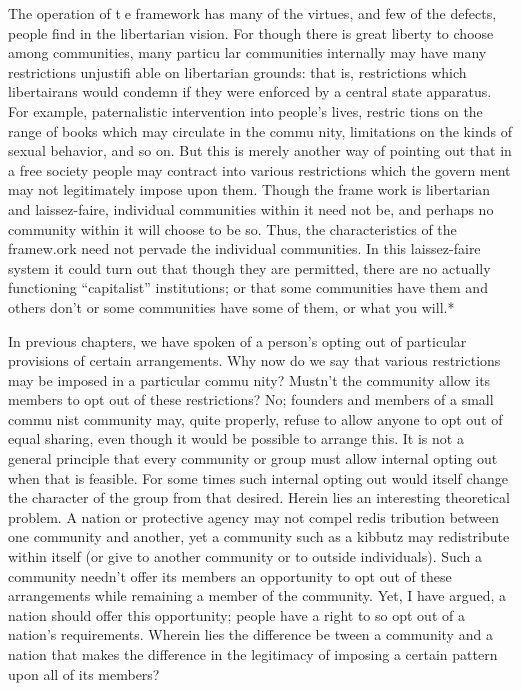 \documentclass[11pt,openany]{book}
\begin{document}
The operation of te framework has many of the virtues, and few of the defects, people find in the libertarian vision. For though there is great liberty to choose among communities, many particu lar communities internally may have many restrictions unjustifi able on libertarian grounds: that is, restrictions which libertairans would condemn if they were enforced by a central state apparatus. For example, paternalistic intervention into people's lives, restric tions on the range of books which may circulate in the commu nity, limitations on the kinds of sexual behavior, and so on. But this is merely another way of pointing out that in a free society people may contract into various restrictions which the govern ment may not legitimately impose upon them. Though the frame work is libertarian and laissez-faire, individual communities within it need not be, and perhaps no community within it will choose to be so. Thus, the characteristics of the framew.ork need not pervade the individual communities. In this laissez-faire system it could turn out that though they are permitted, there are no actually functioning ``capitalist'' institutions; or that some communities have them and others don't or some communities have some of them, or what you will.* 

In previous chapters, we have spoken of a person's opting out of particular provisions of certain arrangements. Why now do we say that various restrictions may be imposed in a particular commu nity? Mustn't the community allow its members to opt out of these restrictions? No; founders and members of a small commu nist community may, quite properly, refuse to allow anyone to opt out of equal sharing, even though it would be possible to arrange this. It is not a general principle that every community or group must allow internal opting out when that is feasible. For some times such internal opting out would itself change the character of the group from that desired. Herein lies an interesting theoretical problem. A nation or protective agency may not compel redis tribution between one community and another, yet a community such as a kibbutz may redistribute within itself (or give to another community or to outside individuals). Such a community needn't offer its members an opportunity to opt out of these arrangements while remaining a member of the community. Yet, I have argued, a nation should offer this opportunity; people have a right to so opt out of a nation's requirements. Wherein lies the difference be tween a community and a nation that makes the difference in the legitimacy of imposing a certain pattern upon all of its members? 
\end{document}
